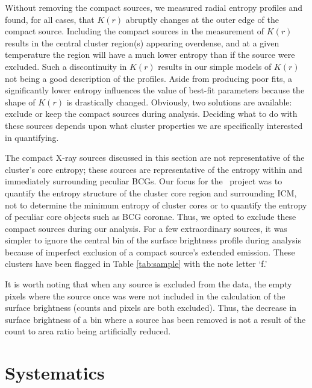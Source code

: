 Without removing the compact sources, we measured radial entropy
profiles and found, for all cases, that $K(r)$ abruptly changes at the
outer edge of the compact source. Including the compact sources in the
measurement of $K(r)$ results in the central cluster region(s)
appearing overdense, and at a given temperature the region will have a
much lower entropy than if the source were excluded. Such a
discontinuity in $K(r)$ results in our simple models of $K(r)$ not
being a good description of the profiles. Aside from producing poor
fits, a significantly lower entropy influences the value of best-fit
parameters because the shape of $K(r)$ is drastically
changed. Obviously, two solutions are available: exclude or keep the
compact sources during analysis.  Deciding what to do with these
sources depends upon what cluster properties we are specifically
interested in quantifying.

The compact X-ray sources discussed in this section are not
representative of the cluster's core entropy; these sources are
representative of the entropy within and immediately surrounding
peculiar BCGs. Our focus for the \accept\ project was to quantify the
entropy structure of the cluster core region and surrounding ICM, not
to determine the minimum entropy of cluster cores or to quantify the
entropy of peculiar core objects such as BCG coronae. Thus, we opted
to exclude these compact sources during our analysis. For a few
extraordinary sources, it was simpler to ignore the central bin of the
surface brightness profile during analysis because of imperfect
exclusion of a compact source's extended emission. These clusters have
been flagged in Table \ref{tab:sample} with the note letter `f.'

It is worth noting that when any source is excluded from the data, the
empty pixels where the source once was were not included in the
calculation of the surface brightness (counts and pixels are both
excluded). Thus, the decrease in surface brightness of a bin where a
source has been removed is not a result of the count to area ratio
being artificially reduced.

\section{Systematics}
\label{sec:entsuppsys}

